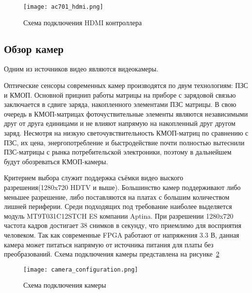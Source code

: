 \begin{figure}[ht]
  \centering
  \texttt{[image: ac701\_hdmi.png]}
  \caption{ Схема подключения HDMI контроллера }
  \label{fig:domain:ac701:hdmi}
\end{figure}

\subsection{Обзор камер}
\label{sub:domain:camera}

Одним из источников видео являются видеокамеры.

Оптические сенсоры современных камер производятся по двум технологиям: ПЗС и КМОП.
Основной прицнип работы матрицы на приборе с зарядовой связью заключается в сдвиге заряда,
накопленного элементами ПЗС матрицы.
В свою очередь в КМОП-матрицах фоточуствительные элементы являются независимыми друг от друга единицами
и не влияют напрямую на накопленный друг другом заряд.
Несмотря на низкую светочувствительность КМОП-матриц по сравнению с ПЗС, их цена, энергопотребление и
быстродействие почти полностью вытеснили ПЗС-матрицы с рынка потребительской электроники, поэтому
в дальнейшем будут обозреваться КМОП-камеры.

Критерием выбора служит поддержка съёмки видео выского разрешения(1280x720 HDTV и выше).
Большинство камер поддерживают либо меньшее разрешение, либо поставляются на платах с большим
количеством лишней периферии. Среди подходящих под требование наиболее выделяется модуль
MT9T031C12STCH ES компании Aptina. При разрешении 1280x720 частота кадров достигает 38 снимков в секунду,
что приемлимо для восприятия человеком. Так как современные FPGA работают от напряжения 3.3 В, данная камера
может питаться напрямую от источника питания для платы без преобразований\cite{image_sensor_datasheet}.
Схема подключения камеры представлена на рисунке~\ref{fig:domain:camera:camera_configuration}

\begin{figure}[ht]
  \centering
  \texttt{[image: camera\_configuration.png]}
  \caption{ Схема подключения камеры \cite{camera_module_datasheet} }
  \label{fig:domain:camera:camera_configuration}
\end{figure}
